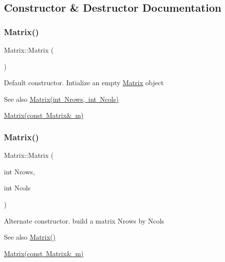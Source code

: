 \subsection{Constructor \& Destructor Documentation}
\mbox{\label{class_matrix_a2dba13c45127354c9f75ef576f49269b}} 
\subsubsection{\texorpdfstring{Matrix()}{Matrix()}\hspace{0.1cm}{\footnotesize\ttfamily [1/3]}}
{\footnotesize\ttfamily Matrix\+::\+Matrix (\begin{DoxyParamCaption}{ }\end{DoxyParamCaption})}

Default constructor. Intialize an empty \mbox{\hyperlink{class_matrix}{Matrix}} object \begin{DoxySeeAlso}{See also}
\mbox{\hyperlink{class_matrix_a135a15de1126d735bb95fcc839d739d7}{Matrix(int Nrows, int Ncols)}} 

\mbox{\hyperlink{class_matrix_a765f4dcb51b6829311cc3e7576388423}{Matrix(const Matrix\& m)}} 
\end{DoxySeeAlso}
\mbox{\label{class_matrix_a135a15de1126d735bb95fcc839d739d7}} 
\subsubsection{\texorpdfstring{Matrix()}{Matrix()}\hspace{0.1cm}{\footnotesize\ttfamily [2/3]}}
{\footnotesize\ttfamily Matrix\+::\+Matrix (\begin{DoxyParamCaption}\item[{int}]{Nrows,  }\item[{int}]{Ncols }\end{DoxyParamCaption})}

Alternate constructor. build a matrix Nrows by Ncols \begin{DoxySeeAlso}{See also}
\mbox{\hyperlink{class_matrix_a2dba13c45127354c9f75ef576f49269b}{Matrix()}} 

\mbox{\hyperlink{class_matrix_a765f4dcb51b6829311cc3e7576388423}{Matrix(const Matrix\& m)}} 
\end{DoxySeeAlso}

